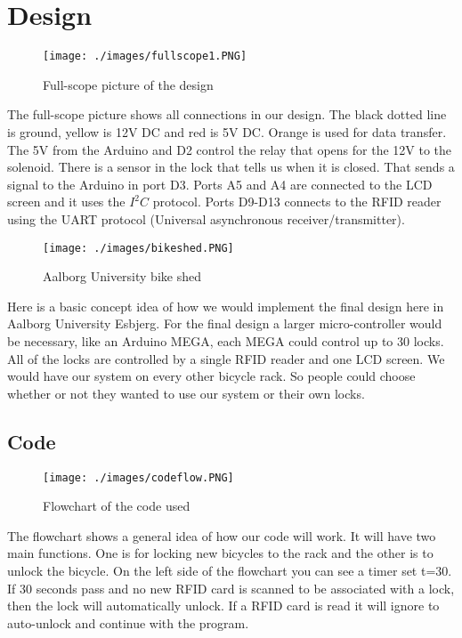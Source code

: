\section{Design}

\begin{figure}[H]
    \centering
    \texttt{[image: ./images/fullscope1.PNG]}
    \caption{Full-scope picture of the design }
    \label{fig:rfid1}
\end{figure}

The full-scope picture shows all connections in our design. The black dotted line is ground, yellow is 12V DC and red is 5V DC. Orange is used for data transfer. The 5V from the Arduino and D2 control the relay that opens for the 12V to the solenoid. There is a sensor in the lock that tells us when it is closed. That sends a signal to the Arduino in port D3. Ports A5 and A4 are connected to the LCD screen and it uses the $I^2 C$ protocol. Ports D9-D13 connects to the RFID reader using the UART protocol (Universal asynchronous receiver/transmitter).

\begin{figure}[H]
    \centering
    \texttt{[image: ./images/bikeshed.PNG]}
    \caption{Aalborg University bike shed }
    \label{fig:bikeshed}
\end{figure}

Here is a basic concept idea of how we would implement the final design here in Aalborg University Esbjerg. For the final design a larger micro-controller would be necessary, like an Arduino MEGA, each MEGA could control up to 30 locks. All of the locks are controlled by a single RFID reader and one LCD screen. We would have our system on every other bicycle rack. So people could choose whether or not they wanted to use our system or their own locks. 

\subsection{Code}

\begin{figure}[H]
    \centering
    \texttt{[image: ./images/codeflow.PNG]}
    \caption{Flowchart of the code used }
    \label{fig:codeflow}
\end{figure}

The flowchart shows a general idea of how our code will work. It will have two main functions. One is for locking new bicycles to the rack and the other is to unlock the bicycle. On the left side of the flowchart you can see a timer set t=30. If 30 seconds pass and no new RFID card is scanned to be associated with a lock, then the lock will automatically unlock. If a RFID card is read it will ignore to auto-unlock and continue with the program. 

